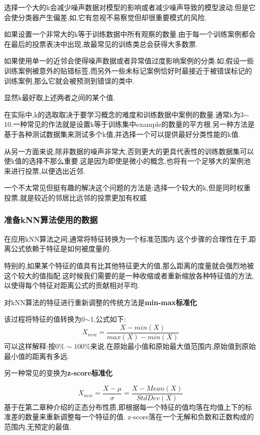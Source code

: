 \documentclass[11pt,a4paper,oneside]{book}
\begin{document}
选择一个大的k会减少噪声数据对模型的影响或者减少噪声导致的模型波动,但是它会使分类器产生偏差,如,它有忽视不易察觉但却很重要模式的风险.

如果设置一个非常大的k等于训练数据中所有观察的数量.由于每一个训练案例都会在最后的投票表决中出现,故最常见的训练类总会获得大多数票.

如果使用单一的近邻会使得噪声数据或者异常值过度影响案例的分类.如,假设一些训练案例被意外的贴错标签,而另外一些未标记案例恰好时最接近于被错误标记的训练案例,那么它就会被预测到错误的类中.

显然k最好取上述两者之间的某个值.
\begin{tcolorbox}[colback=pink!10!white,colframe=pink!100!black]
在实际中,k的选取取决于要学习概念的难度和训练数据中案例的数量.通常k为3$\sim$10.一种常见的作法就是设置k等于训练集中example的数量的平方根.另一种方法是基于各种测试数据集来测试多个k值,并选择一个可以提供最好分类性能的k值.
\end{tcolorbox}

从另一方面来说,除非数据的噪声非常大,否则更大的更具代表性的训练数据集可以使k值的选择不那么重要.这是因为即使是微小的概念,也将有一个足够大的案例池来进行投票,以便选出近邻.
\begin{tcolorbox}[colback=pink!10!white,colframe=pink!100!black]
一个不太常见但挺有趣的解决这个问题的方法是:选择一个较大的k,但是同时权重投票,就是较近的邻居比远邻的投票更加有权威
\end{tcolorbox}
\subsubsection{准备kNN算法使用的数据}
在应用kNN算法之间,通常将特征转换为一个标准范围内.这个步骤的合理性在于,距离公式依赖于特征是如何被度量的.

特别的,如果某个特征的值具有比其他特征更大的值,那么距离的度量就会强烈地被这个较大的值指配.这时候我们需要的是一种收缩或者重新缩放各种特征值的方法,以使得每个特征对距离公式的贡献相对平均.

对kNN算法的特征进行重新调整的传统方法是\textbf{min-max标准化}
\begin{tcolorbox}[colback=blue!7!white,colframe=blue!40]
该过程将特征的值转换为0$\sim$1,公式如下:
$$X_{new}=\frac{X-min(X)}{max(X)-min(X)}$$
可以这样解释:按0$\%\sim100\%$来说,在原始最小值和原始最大值范围内,原始值到原始最小值的距离有多远.
\end{tcolorbox}
另一种常见的变换为\textbf{z-score标准化}
\begin{tcolorbox}[colback=blue!7!white,colframe=blue!40]
$$X_{new}=\frac{X-\mu}{\sigma}=\frac{X-Mean(X)}{StdDev(X)}$$
基于在第二章种介绍的正态分布性质,即根据每一个特征的值均落在均值上下的标准差的数量来重新调整每一个特征的值. z-score落在一个无解和负数和正数构成的范围内,无预定的最值.
\end{tcolorbox}
\end{document}
